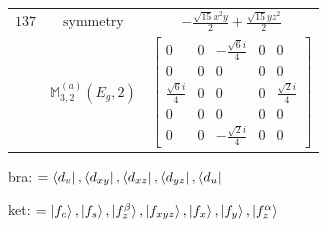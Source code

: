 \documentclass[fleqn,8pt,landscape]{jsarticle}
\begin{document}
\begin{longtable}{ccc}
$ 137 $ & $ \text{symmetry} $ & $ - \frac{\sqrt{15} x^{2} y}{2} + \frac{\sqrt{15} y z^{2}}{2} $ \\
$  $ & $ \mathbb{M}_{3,2}^{(a)}(E_{g},2) $ & $ \begin{bmatrix} 0 & 0 & - \frac{\sqrt{6} i}{4} & 0 & 0 \\ 0 & 0 & 0 & 0 & 0 \\ \frac{\sqrt{6} i}{4} & 0 & 0 & 0 & \frac{\sqrt{2} i}{4} \\ 0 & 0 & 0 & 0 & 0 \\ 0 & 0 & - \frac{\sqrt{2} i}{4} & 0 & 0 \end{bmatrix} $ \\ \hline
\end{longtable}
bra: $=\bra{d_{v}}, \bra{d_{xy}}, \bra{d_{xz}}, \bra{d_{yz}}, \bra{d_{u}}$

\noindent
ket: $=\ket{f_{c}}, \ket{f_{s}}, \ket{f_{z}^{\beta}}, \ket{f_{xyz}}, \ket{f_{x}}, \ket{f_{y}}, \ket{f_{z}^{\alpha}}$
\renewcommand{\arraystretch}{1.6}
\end{document}
